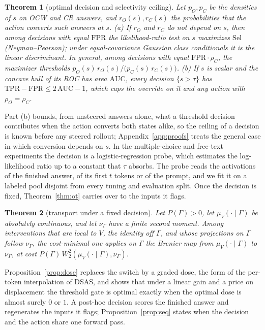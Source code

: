 \documentclass{article}
\newtheorem{theorem}{Theorem}
\newcommand{\ocw}{OCW}
\newcommand{\crok}{CR}
\newcommand{\Wtwo}{W_2}
\begin{document}
\begin{theorem}[optimal decision and selectivity ceiling]
\label{thm:gate}
Let $p_O,p_C$ be the densities of $s$ on \ocw{} and \crok{} answers, and
$r_O(s),r_C(s)$ the probabilities that the action converts such answers at
$s$.
(a) If $r_O$ and $r_C$ do not depend on $s$, then among decisions with equal
$\mathrm{FPR}$ the likelihood-ratio test on $s$ maximizes $\mathrm{Sel}$
(Neyman--Pearson); under equal-covariance Gaussian
class conditionals it is the linear discriminant. In general, among decisions
with equal $\mathrm{FPR}\cdot\rho_C$, the maximizer thresholds
$p_O(s)\,r_O(s)/\big(p_C(s)\,r_C(s)\big)$.
(b) If $s$ is scalar and the concave hull of its ROC has area $\mathrm{AUC}$,
every decision $\{s>\tau\}$ has $\mathrm{TPR}-\mathrm{FPR}\le2\,\mathrm{AUC}-1$,
which caps the override on it and any action with $\rho_O=\rho_C$.
\end{theorem}

Part (b) bounds, from unsteered answers alone, what a threshold decision
contributes when the action converts both states alike, so the ceiling of a
decision is known before any steered rollout; Appendix~\ref{app:proofs} treats
the general case in which conversion depends on $s$. In the multiple-choice and free-text experiments the decision is a
logistic-regression probe, which estimates the log-likelihood ratio up to a
constant that $\tau$ absorbs. The probe reads the activations of the finished
answer, of its first $t$ tokens or of the prompt, and we fit it on a labeled
pool disjoint from every tuning and evaluation split. Once the decision is
fixed, Theorem~\ref{thm:ot} carries over to the inputs it
flags.

\begin{theorem}[transport under a fixed decision]
\label{thm:joint}
Let $P(\Gamma)>0$, let $\mu_V(\cdot\mid\Gamma)$ be absolutely continuous, and
let $\nu_\Gamma$ have a finite second moment. Among interventions that are
local to $V$, the identity off $\Gamma$, and whose projections on $\Gamma$
follow $\nu_\Gamma$, the cost-minimal one applies on $\Gamma$ the Brenier map
from $\mu_V(\cdot\mid\Gamma)$ to $\nu_\Gamma$, at cost
$P(\Gamma)\,\Wtwo^2(\mu_V(\cdot\mid\Gamma),\nu_\Gamma)$.
\end{theorem}

Proposition~\ref{prop:dose} replaces the switch by a graded dose, the form
of the per-token interpolation of DSAS, and shows that under a linear gain and
a price on displacement the threshold gate is optimal exactly when the optimal
dose is almost surely $0$ or $1$. A post-hoc decision
scores the finished answer and regenerates the inputs it flags;
Proposition~\ref{prop:seq} states when the decision and the action share one
forward pass.
\end{document}
